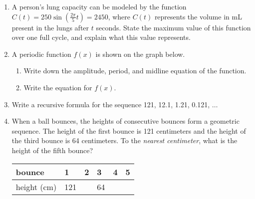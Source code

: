 \documentclass[12pt, twoside]{article}
\begin{document}
\begin{enumerate}
\newpage
\item A person's lung capacity can be modeled by the function $\displaystyle C(t) = 250\sin(\frac{2\pi}{5} t) = 2450$, where $C(t)$ represents the volume in mL present in the lungs after $t$ seconds. State the maximum value of this function over one full cycle, and explain what this value represents. %
\vspace{5cm}

\item A periodic function $f(x)$ is shown on the graph below.
\begin{enumerate}
    \item Write down the amplitude, period, and midline equation of the function. \vspace{2cm}
    \begin{center}
        \end{center}
        \item Write the equation for $f(x)$.
    \end{enumerate}

\newpage
\item Write a recursive formula for the sequence 121, 12.1, 1.21, 0.121, $\ldots$ \vspace{3cm}

\item When a ball bounces, the heights of consecutive bounces form a geometric sequence. The height of the first bounce is 121 centimeters and the height of the third bounce is 64 centimeters. To the \emph{nearest centimeter}, what is the height of the fifth bounce? %
    \begin{center}
    \begin{tabular}{|p{3cm}|p{1cm}|p{1cm}|p{1cm}|p{1cm}|p{1cm}|}
        \hline
        bounce & 1 & 2 & 3 & 4 & 5 \\
        \hline
        height (cm) & 121 & & 64 & & \\[0.25cm]
        \hline
    \end{tabular}
    \end{center}
\vspace{5cm}


\end{enumerate}
\end{document}
